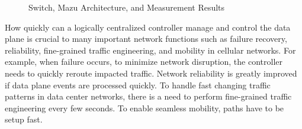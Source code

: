 \documentclass[onecolumn]{sig-alternate-10pt-onecolumn}
\begin{document}
\begin{figure}[b]
\centering
\hspace{-0.15in}
\hspace{-0.25in}
\vspace*{-0.15in}
\caption{Switch, Mazu Architecture, and Measurement Results}
\vspace*{-0.1in}
\label{fig:mazu}
\end{figure}
How quickly can a logically centralized controller manage and control the data
plane is crucial to many important network functions such as failure recovery,
reliability, fine-grained traffic engineering, and mobility in cellular
networks. For example, when failure occurs, to minimize network disruption, the
controller needs to quickly reroute impacted traffic. Network reliability is
greatly improved if data plane events are processed quickly. To handle fast
changing traffic patterns in data center networks, there is a need to perform
fine-grained traffic engineering every few seconds. To enable seamless mobility,
paths have to be setup fast.   
 
\end{document}
